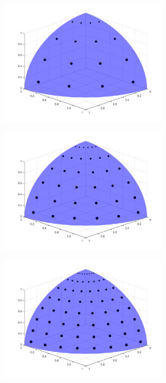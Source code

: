 \begin{figure}
\begin{subfigure}[b]{0.48\textwidth}
		\caption{}
	\end{subfigure}
	\hfill
	\begin{subfigure}[b]{0.48\textwidth}
		\centering
		\includegraphics[width=0.92\textwidth]{figures/sec_Sn/PGLC4_4_3D.png}
		\caption{}
	\end{subfigure}
	\vfill
	\begin{subfigure}[b]{0.48\textwidth}
		\centering
		\includegraphics[width=0.92\textwidth]{figures/sec_Sn/PGLC6_6_3D.png}
		\caption{}
	\end{subfigure}
	\hfill
	\begin{subfigure}[b]{0.48\textwidth}
		\centering
		\includegraphics[width=0.92\textwidth]{figures/sec_Sn/PGLC8_8_3D.png}

\end{subfigure}
\end{figure}
